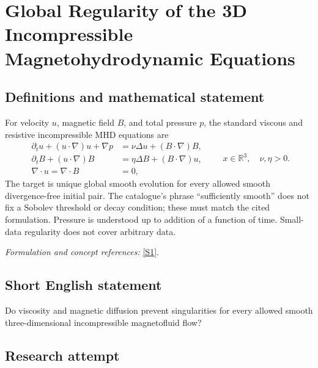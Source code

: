 \documentclass[11pt,a4paper]{article}
\newcommand{\R}{\mathbb{R}}
\newcommand{\sref}[2]{\hyperlink{source:#1:#2}{[S#2]}}
\newif\ifshowcatalogue
\newcommand{\cataloguescope}[1]{\ifshowcatalogue
 \paragraph{Exact scope in the supplied catalogue.}
 \begin{quote}\small #1\end{quote}\fi}
\numberwithin{equation}{section}
\begin{document}
\setcounter{section}{0}
\clearpage
\section*{\texorpdfstring{Global Regularity of the 3D Incompressible Magnetohydrodynamic Equations}{Global Regularity of the 3D Incompressible Magnetohydrodynamic Equations}}\label{30006732}
\subsection{Definitions and mathematical statement}
For velocity $u$, magnetic field $B$, and total pressure $p$, the standard viscous and resistive incompressible MHD equations are
\[
 \begin{aligned}
 \partial_tu+(u\cdot\nabla)u+\nabla p&=\nu\Delta u+(B\cdot\nabla)B,\\
 \partial_tB+(u\cdot\nabla)B&=\eta\Delta B+(B\cdot\nabla)u,\\
 \nabla\cdot u=\nabla\cdot B&=0,
 \end{aligned}\qquad x\in\R^3,\quad\nu,\eta>0.
\]
The target is unique global smooth evolution for every allowed smooth divergence-free initial pair. The catalogue's phrase ``sufficiently smooth'' does not fix a Sobolev threshold or decay condition; these must match the cited formulation. Pressure is understood up to addition of a function of time. Small-data regularity does not cover arbitrary data.
\par\smallskip\textit{Formulation and concept references:} \sref{30006732}{1}.
\cataloguescope{Prove or disprove that every sufficiently smooth divergence-free initial velocity and magnetic field on R\textasciicircum{}3 generates a unique global smooth solution of the standard incompressible three-dimensional MHD system with positive viscosity and magnetic diffusivity.}
\subsection{Short English statement}
Do viscosity and magnetic diffusion prevent singularities for every allowed smooth three-dimensional incompressible magnetofluid flow?
\subsection{Research attempt}
\end{document}
